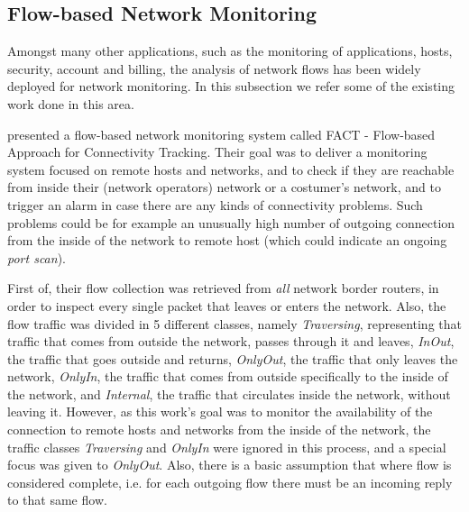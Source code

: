 \documentclass[runningheads,a4paper]{llncs}
\begin{document}
\subsection{Flow-based Network Monitoring}\label{ssec:monitor}
Amongst many other applications, such as the monitoring of applications, hosts, security, account and billing, the analysis of network flows has been widely deployed for network monitoring. In this subsection we refer some of the existing work done in this area.


\cite{schatzmann2011fact} presented a flow-based network monitoring system called FACT - Flow-based Approach for Connectivity Tracking. Their goal was to deliver a monitoring system focused on remote hosts and networks, and to check if they are reachable from inside their (network operators) network or a costumer's network, and to trigger an alarm in case there are any kinds of connectivity problems. Such problems could be for example an unusually high number of outgoing connection from the inside of the network to remote host (which could indicate an ongoing \textit{port scan}).


First of, their flow collection was retrieved from \textit{all} network border routers, in order to inspect every single packet that leaves or enters the network. Also, the flow traffic was divided in 5 different classes, namely \textit{Traversing}, representing that traffic that comes from outside the network, passes through it and leaves, \textit{InOut}, the traffic that goes outside and returns, \textit{OnlyOut}, the traffic that only leaves the network, \textit{OnlyIn}, the traffic that comes from outside specifically to the inside of the network, and \textit{Internal}, the traffic that circulates inside the network, without leaving it. However, as this work's goal was to monitor the availability of the connection to remote hosts and networks from the inside of the network, the traffic classes \textit{Traversing} and \textit{OnlyIn} were ignored in this process, and a special focus was given to \textit{OnlyOut}. Also, there is a basic assumption that where flow is considered complete, i.e. for each outgoing flow there must be an incoming reply to that same flow.
\end{document}
